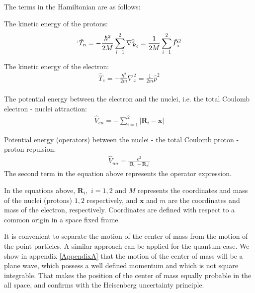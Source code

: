 The terms in the Hamiltonian are as follows:

The kinetic energy of the protons:
\begin{equation}`
\begin{split}
 \hat{T}_n = - \frac{\hbar^2}{2M}\sum_{i=1}^2{\nabla_{R_i}^2 } = \frac{1}{2M}\sum_{i=1}^2{\hat{P}_i^2 }
\end{split}
\end{equation}

The kinetic energy of the electron:
\begin{equation}
\begin{split}
 \hat{T}_e= -\frac{\hbar^2}{2m}\nabla_{x}^2 = \frac{1}{2m}\hat{p}^2  \\[.8em]
\end{split}
\end{equation}

The potential energy between the electron and the nuclei, i.e. the total Coulomb electron - nuclei attraction:
\begin{equation}
\begin{split}
 \hat{V}_{en} = -\sum_{i=1}^2{\left|\mathbf{R}_i - \mathbf{x}\right| }   
\end{split}
\end{equation}

Potential energy (operators) between the nuclei - the total Coulomb proton - proton repulsion. 
\begin{equation}
\begin{split}
 \hat{V}_{nn} =  \frac{e^2}{\left|\mathbf{R}_1 - \mathbf{R}_2\right| } 
\end{split}
\end{equation}
The second term in the equation above represents the operator expression.

In the equations above, $ \mathbf{R}_i,\,\, i = 1,2 $ and $ M $ represents the coordinates and mass of the nuclei (protons) $1,2$ respectively, and $ \mathbf{x} $ and $ m $ are the coordinates and mass of the electron, respectively. Coordinates are defined with respect to a common origin in a space fixed frame.

It is convenient to separate the motion of the center of mass from the motion of the point particles. A similar approach can be applied for the quantum case. We show in appendix \ref{AppendixA} that the motion of the center of mass will be a plane wave, which possess a well defined momentum and which is not square integrable. That makes the position of the center of mass equally probable in the all space, and confirms with the Heisenberg uncertainty principle.

